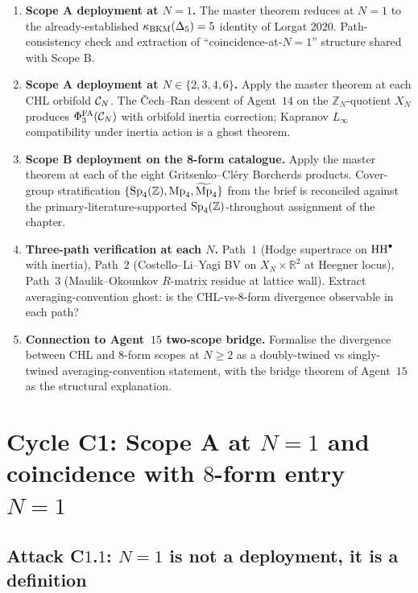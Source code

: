 \begin{enumerate}
\item[(C$1$)] \textbf{Scope A deployment at $N = 1$.} The master theorem
reduces at $N = 1$ to the already-established $\kappa_{\mathrm{BKM}}(\Delta_5) = 5$
identity of Lorgat $2020$. Path-consistency check and extraction of
``coincidence-at-$N = 1$'' structure shared with Scope B.
\item[(C$2$)] \textbf{Scope A deployment at $N \in \{2, 3, 4, 6\}$.}
Apply the master theorem at each CHL orbifold $\mathcal{C}_N$. The \v{C}ech--Ran
descent of Agent~$14$ on the $\mathbb{Z}_N$-quotient $X_N$ produces
$\Phi^{\mathrm{FA}}_{3}(\mathcal{C}_N)$ with orbifold inertia correction; Kapranov $L_\infty$
compatibility under inertia action is a ghost theorem.
\item[(C$3$)] \textbf{Scope B deployment on the 8-form catalogue.} Apply
the master theorem at each of the eight Gritsenko--Cl\'ery Borcherds
products. Cover-group stratification $\{\mathrm{Sp}_{4}(\mathbb{Z}), \mathrm{Mp}_{4}, \widetilde{\mathrm{Mp}}_{4}\}$
from the brief is reconciled against the primary-literature-supported
$\mathrm{Sp}_{4}(\mathbb{Z})$-throughout assignment of the chapter.
\item[(C$4$)] \textbf{Three-path verification at each $N$.} Path~$1$
(Hodge supertrace on $\mathrm{HH}^\bullet$ with inertia), Path~$2$
(Costello--Li--Yagi BV on $X_N \times \mathbb{R}^2$ at Heegner locus),
Path~$3$ (Maulik--Okounkov $R$-matrix residue at lattice wall). Extract
averaging-convention ghost: is the CHL-vs-8-form divergence observable
in each path?
\item[(C$5$)] \textbf{Connection to Agent~$15$ two-scope bridge.}
Formalise the divergence between CHL and 8-form scopes at $N \geq 2$ as
a doubly-twined vs singly-twined averaging-convention statement, with
the bridge theorem of Agent~$15$ as the structural explanation.
\end{enumerate}

\bigskip

\section{Cycle C1: Scope A at $N = 1$ and coincidence with $8$-form
entry $N = 1$}
\label{sec:cycle-c1-n1-coincidence}

\subsection*{Attack C$1$.$1$: $N = 1$ is not a deployment, it is a
definition}

